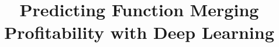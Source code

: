 \documentclass[sigplan,10pt,screen]{acmart}
\begin{document}



\title{Predicting Function Merging Profitability with Deep Learning}









%

\end{document}
